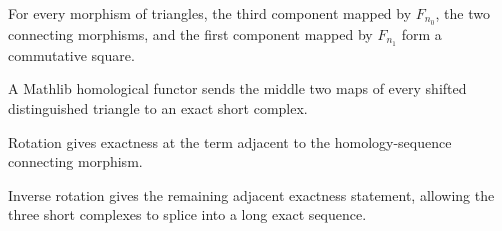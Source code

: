 \begin{theorem}
  \label{thm:mathlib-homology-sequence-connecting-naturality}
  \mathlibok
  For every morphism of triangles, the third component mapped by $F_{n_0}$,
  the two connecting morphisms, and the first component mapped by $F_{n_1}$
  form a commutative square.
\end{theorem}

\begin{theorem}
  \label{thm:mathlib-homology-sequence-exact-two}
  \mathlibok
  A Mathlib homological functor sends the middle two maps of every shifted
  distinguished triangle to an exact short complex.
\end{theorem}

\begin{theorem}
  \label{thm:mathlib-homology-sequence-exact-three}
  \mathlibok
  Rotation gives exactness at the term adjacent to the homology-sequence
  connecting morphism.
\end{theorem}

\begin{theorem}
  \label{thm:mathlib-homology-sequence-exact-one}
  \mathlibok
  Inverse rotation gives the remaining adjacent exactness statement, allowing
  the three short complexes to splice into a long exact sequence.
\end{theorem}

